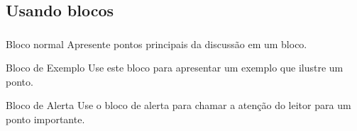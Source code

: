 \documentclass[12pt, xcolor=table, aspectratio=169]{beamer}
\makeatletter
\newcommand*{\currentname}{\@currentlabelname}
\makeatother
\begin{document}
\subsection[Usando blocos]{Usando blocos}

\begin{frame}
  \frametitle{\currentname}
  \begin{block}{Bloco normal}
   Apresente pontos principais da discussão em um bloco.
  \end{block}

  \begin{exampleblock}{Bloco de Exemplo}
    Use este bloco para apresentar um exemplo que ilustre um ponto.
  \end{exampleblock}
  \begin{alertblock}{Bloco de Alerta}
   Use o bloco de alerta para chamar a atenção do leitor para um ponto importante.
  \end{alertblock}


\end{frame}
\end{document}
